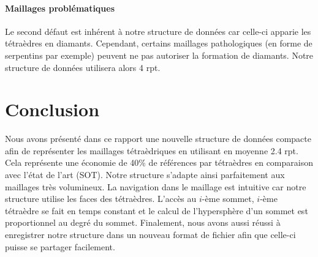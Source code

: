 \paragraph{Maillages problématiques}Le second défaut est inhérent à notre structure de données car celle-ci apparie les tétraèdres en diamants. Cependant, certains maillages pathologiques (en forme de serpentins par exemple) peuvent ne pas autoriser la formation de diamants. Notre structure de données utilisera alors 4 rpt.

\section{Conclusion}
\noindent
Nous avons présenté dans ce rapport une nouvelle structure de données compacte afin de représenter les maillages tétraèdriques en utilisant en moyenne 2.4 rpt. Cela représente une économie de 40\% de références par tétraèdres en comparaison avec l'état de l'art (SOT). Notre structure s'adapte ainsi parfaitement aux maillages très volumineux. La navigation dans le maillage est intuitive car notre structure utilise les faces des tétraèdres. L'accès au $i$-ème sommet, $i$-ème tétraèdre se fait en temps constant et le calcul de l'hypersphère d'un sommet est proportionnel au degré du sommet. Finalement, nous avons aussi réussi à enregistrer notre structure dans un nouveau format de fichier afin que celle-ci puisse se partager facilement.